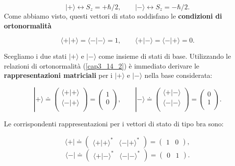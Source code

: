 \documentclass[a4paper,12pt,oneside]{book}
\begin{document}
\begin{equation}
| + \rangle \leftrightarrow S_z= +\hbar/2, \qquad | - \rangle \leftrightarrow S_z=-\hbar/2 .
\label{cap3_14}
\end{equation}
Come abbiamo visto, questi vettori di stato soddisfano le \textbf{condizioni di ortonormalità}

\begin{equation}
\langle + | + \rangle = \langle - | - \rangle =1,\qquad \langle + | - \rangle = \langle - | + \rangle =0 .
\label{cap3_14_2}
\end{equation}

Scegliamo i due stati $| + \rangle $ e $ | - \rangle$ come insieme di stati di base. Utilizzando le relazioni di ortonormalità (\ref{cap3_14_2}) è immediato derivare le \textbf{rappresentazioni matriciali} per i $| + \rangle$ e $| - \rangle$ nella base considerata:

\begin{equation}
| + \rangle \doteq
\begin{pmatrix}
\langle + | + \rangle \\
\langle - | + \rangle \\
\end{pmatrix} = 
\begin{pmatrix}
1 \\
0 \\
\end{pmatrix}, \qquad
| - \rangle \doteq
\begin{pmatrix}
\langle + | - \rangle \\
\langle - | - \rangle \\
\end{pmatrix} = 
\begin{pmatrix}
0 \\
1 \\
\end{pmatrix} .
\end{equation}

Le corrispondenti rappresentazioni per i vettori di stato di tipo bra sono:

\begin{equation}
\langle + | \doteq
\begin{pmatrix}
\langle + | + \rangle ^* & \langle - | + \rangle ^* 
\end{pmatrix} = 
\begin{pmatrix}
1 & 0
\end{pmatrix} ,
\end{equation}
\begin{equation}
\langle - |  \doteq
\begin{pmatrix}
\langle + | - \rangle ^* & \langle - | - \rangle ^* 
\end{pmatrix} = 
\begin{pmatrix}
0 & 1
\end{pmatrix} .
\end{equation}
\end{document}
